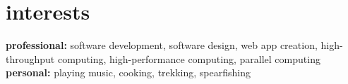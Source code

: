 \documentclass[]{friggeri-cv} %
\begin{document}

\section{interests}

\textbf{professional:} software development, software design, web app creation, high-throughput computing,  high-performance computing, parallel computing \textbf{personal:} playing music, cooking, trekking, spearfishing
\end{document}
